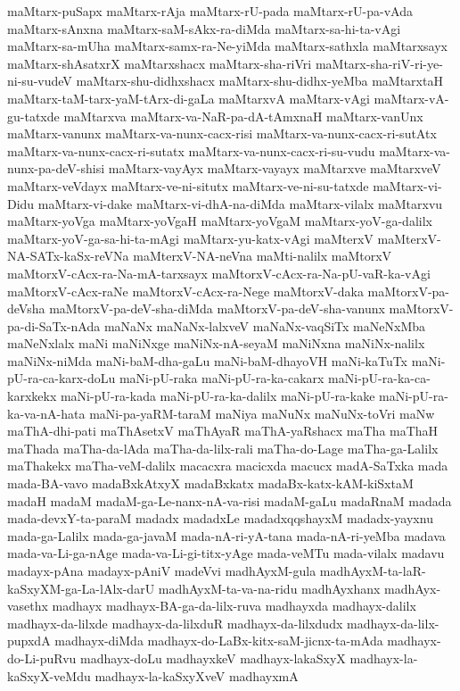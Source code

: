 {maMtarx-puSapx
maMtarx-rAja
maMtarx-rU-pada
maMtarx-rU-pa-vAda
maMtarx-sAnxna
maMtarx-saM-sAkx-ra-diMda
maMtarx-sa-hi-ta-vAgi
maMtarx-sa-mUha
maMtarx-samx-ra-Ne-yiMda
maMtarx-sathxla
maMtarxsayx
maMtarx-shAsatxrX
maMtarxshacx
maMtarx-sha-riVri
maMtarx-sha-riV-ri-ye-ni-su-vudeV
maMtarx-shu-didhxshacx
maMtarx-shu-didhx-yeMba
maMtarxtaH
maMtarx-taM-tarx-yaM-tArx-di-gaLa
maMtarxvA
maMtarx-vAgi
maMtarx-vA-gu-tatxde
maMtarxva
maMtarx-va-NaR-pa-dA-tAmxnaH
maMtarx-vanUnx
maMtarx-vanunx
maMtarx-va-nunx-cacx-risi
maMtarx-va-nunx-cacx-ri-sutAtx
maMtarx-va-nunx-cacx-ri-sutatx
maMtarx-va-nunx-cacx-ri-su-vudu
maMtarx-va-nunx-pa-deV-shisi
maMtarx-vayAyx
maMtarx-vayayx
maMtarxve
maMtarxveV
maMtarx-veVdayx
maMtarx-ve-ni-situtx
maMtarx-ve-ni-su-tatxde
maMtarx-vi-Didu
maMtarx-vi-dake
maMtarx-vi-dhA-na-diMda
maMtarx-vilalx
maMtarxvu
maMtarx-yoVga
maMtarx-yoVgaH
maMtarx-yoVgaM
maMtarx-yoV-ga-dalilx
maMtarx-yoV-ga-sa-hi-ta-mAgi
maMtarx-yu-katx-vAgi
maMterxV
maMterxV-NA-SATx-kaSx-reVNa
maMterxV-NA-neVna
maMti-nalilx
maMtorxV
maMtorxV-cAcx-ra-Na-mA-tarxsayx
maMtorxV-cAcx-ra-Na-pU-vaR-ka-vAgi
maMtorxV-cAcx-raNe
maMtorxV-cAcx-ra-Nege
maMtorxV-daka
maMtorxV-pa-deVsha
maMtorxV-pa-deV-sha-diMda
maMtorxV-pa-deV-sha-vanunx
maMtorxV-pa-di-SaTx-nAda
maNaNx
maNaNx-lalxveV
maNaNx-vaqSiTx
maNeNxMba
maNeNxlalx
maNi
maNiNxge
maNiNx-nA-seyaM
maNiNxna
maNiNx-nalilx
maNiNx-niMda
maNi-baM-dha-gaLu
maNi-baM-dhayoVH
maNi-kaTuTx
maNi-pU-ra-ca-karx-doLu
maNi-pU-raka
maNi-pU-ra-ka-cakarx
maNi-pU-ra-ka-ca-karxkekx
maNi-pU-ra-kada
maNi-pU-ra-ka-dalilx
maNi-pU-ra-kake
maNi-pU-ra-ka-va-nA-hata
maNi-pa-yaRM-taraM
maNiya
maNuNx
maNuNx-toVri
maNw
maThA-dhi-pati
maThAsetxV
maThAyaR
maThA-yaRshacx
maTha
maThaH
maThada
maTha-da-lAda
maTha-da-lilx-rali
maTha-do-Lage
maTha-ga-Lalilx
maThakekx
maTha-veM-dalilx
macacxra
macicxda
macucx
madA-SaTxka
mada
mada-BA-vavo
madaBxkAtxyX
madaBxkatx
madaBx-katx-kAM-kiSxtaM
madaH
madaM
madaM-ga-Le-nanx-nA-va-risi
madaM-gaLu
madaRnaM
madada
mada-devxY-ta-paraM
madadx
madadxLe
madadxqqshayxM
madadx-yayxnu
mada-ga-Lalilx
mada-ga-javaM
mada-nA-ri-yA-tana
mada-nA-ri-yeMba
madava
mada-va-Li-ga-nAge
mada-va-Li-gi-titx-yAge
mada-veMTu
mada-vilalx
madavu
madayx-pAna
madayx-pAniV
madeVvi
madhAyxM-gula
madhAyxM-ta-laR-kaSxyXM-ga-La-lAlx-darU
madhAyxM-ta-va-na-ridu
madhAyxhanx
madhAyx-vasethx
madhayx
madhayx-BA-ga-da-lilx-ruva
madhayxda
madhayx-dalilx
madhayx-da-lilxde
madhayx-da-lilxduR
madhayx-da-lilxdudx
madhayx-da-lilx-pupxdA
madhayx-diMda
madhayx-do-LaBx-kitx-saM-jicnx-ta-mAda
madhayx-do-Li-puRvu
madhayx-doLu
madhayxkeV
madhayx-lakaSxyX
madhayx-la-kaSxyX-veMdu
madhayx-la-kaSxyXveV
madhayxmA
}
